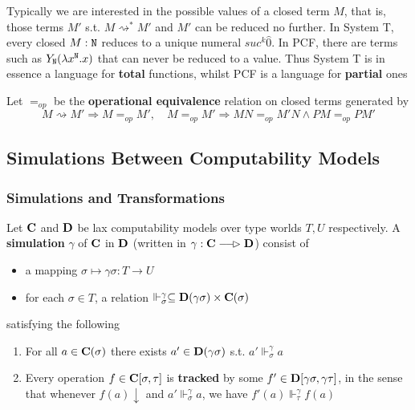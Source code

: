 \documentclass[11pt]{article}
\begin{document}
Typically we are interested in the possible values of a closed term \(M\), that is, those
terms \(M'\) s.t. \(M\rightsquigarrow^*M'\) and \(M'\) can be reduced no further. In System T, every
closed \(M:\texttt{N}\) reduces to a unique numeral \(suc^k\hat{0}\). In PCF, there are terms such
as \(Y_{\texttt{N}}(\lambda x^{\texttt{N}}.x)\)  that can never be reduced to a value. Thus System T is in essence
a language for \textbf{total} functions, whilst PCF is a language for \textbf{partial} ones


Let \(=_{op}\) be the \textbf{operational equivalence} relation on closed terms generated by
\begin{equation*}
M\rightsquigarrow M'\Rightarrow M=_{op}M',\quad M=_{op}M'\Rightarrow MN=_{op}M'N\wedge PM=_{op}PM'
\end{equation*}

\subsection{Simulations Between Computability Models}
\label{sec:org2edba36}
\subsubsection{Simulations and Transformations}
\label{sec:org1530e10}
\begin{definition}[]
Let \(\operatorname{\textbf{C}}\) and \(\operatorname{\textbf{D}}\) be lax computability models over type worlds \(T,U\) respectively. A
\textbf{simulation} \(\gamma\) of \(\operatorname{\textbf{C}}\) in \(\operatorname{\textbf{D}}\) (written in \(\gamma:\bC\lrarhd\bD\))
consist of
\begin{itemize}
\item a mapping \(\sigma\mapsto\gamma\sigma:T\to U\)
\item for each \(\sigma\in T\), a relation \(\Vdash_\sigma^\gamma\subseteq\operatorname{\textbf{D}}(\gamma\sigma)\times\operatorname{\textbf{C}}(\sigma)\)
\end{itemize}
satisfying the following
\begin{enumerate}
\item For all \(a\in\operatorname{\textbf{C}}(\sigma)\) there exists \(a'\in\operatorname{\textbf{D}}(\gamma\sigma)\) s.t. \(a'\Vdash_\sigma^\gamma a\)
\item Every operation \(f\in\operatorname{\textbf{C}}[\sigma,\tau]\) is \textbf{tracked} by some \(f'\in\operatorname{\textbf{D}}[\gamma\sigma,\gamma\tau]\), in the sense that
whenever \(f(a)\downarrow\) and \(a'\Vdash_\sigma^\gamma a\), we have \(f'(a)\Vdash_\tau^\gamma f(a)\)
\end{enumerate}
\end{definition}
\end{document}
